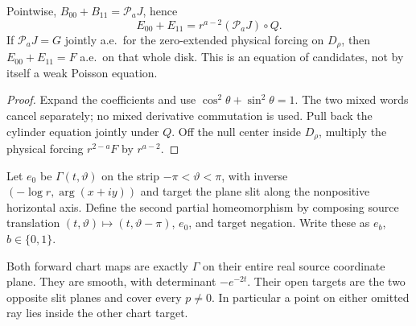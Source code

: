 \begin{lemma}
\label{lem:cylinder-cartesian-candidate-forcing}
\leanok
Pointwise, $B_{00}+B_{11}=\mathcal P_aJ$, hence
\[
 E_{00}+E_{11}=r^{a-2}(\mathcal P_aJ)\circ Q.
\]
If $\mathcal P_aJ=G$ jointly a.e.\ for the zero-extended physical forcing on
$D_\rho$, then $E_{00}+E_{11}=F$ a.e.\ on that whole disk.
This is an equation of candidates, not by itself a weak Poisson equation.
\end{lemma}

\begin{proof}
\leanok
Expand the coefficients and use $\cos^2\theta+\sin^2\theta=1$.
The two mixed words cancel separately; no mixed derivative commutation is used.
Pull back the cylinder equation jointly under $Q$.
Off the null center inside $D_\rho$, multiply the physical forcing
$r^{2-a}F$ by $r^{a-2}$.
\end{proof}

\begin{definition}
\label{def:log-polar-open-atlas}
\leanok
Let $e_0$ be $\Gamma(t,\vartheta)$ on the strip $-\pi<\vartheta<\pi$,
with inverse $(-\log r,\arg(x+iy))$ and target the plane slit along
the nonpositive horizontal axis.
Define the second partial homeomorphism by composing source translation
$(t,\vartheta)\mapsto(t,\vartheta-\pi)$, $e_0$, and target negation.
Write these as $e_b$, $b\in\{0,1\}$.
\end{definition}

\begin{lemma}
\label{lem:log-polar-open-atlas}
\leanok
Both forward chart maps are exactly $\Gamma$ on their entire real source
coordinate plane. They are smooth, with determinant $-e^{-2t}$.
Their open targets are the two opposite slit planes and cover every $p\ne0$.
In particular a point on either omitted ray lies inside the other chart target.
\end{lemma}

